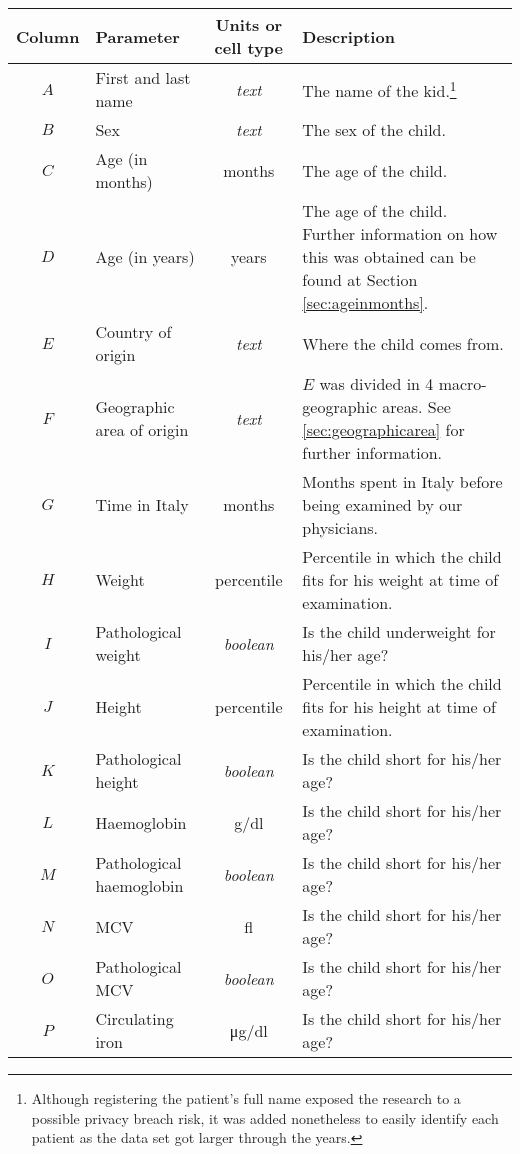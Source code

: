 \begin{footnotesize}
	\centering
	\begin{longtable}{C{.09\mylength} p{.25\mylength} C{.20\mylength} p{.40\mylength}}
	Column & Parameter & Units or cell type & Description\\
	\hline
	$A$ & First and last name & \textit{text} & The name of the kid.\footnote{Although registering the patient's full name exposed the research to a possible privacy breach risk, it was added nonetheless to easily identify each patient as the data set got larger through the years.}\\
	$B$ & Sex & \textit{text} & The sex of the child.\\
	$C$ & Age (in months) & months & The age of the child.\\
	$D$ & Age (in years) & years & The age of the child. Further information on how this was obtained can be found at Section \ref{sec:ageinmonths}.\\
	$E$ & Country of origin & \textit{text} & Where the child comes from.\\
	$F$ & Geographic area of origin & \textit{text} & $E$ was divided in 4 macro-geographic areas. See \ref{sec:geographicarea} for further information.\\
	$G$ & Time in Italy & months &  Months spent in Italy before being examined by our physicians.\\
	$H$ & Weight & percentile & Percentile in which the child fits for his weight at time of examination.\\
	$I$ & Pathological weight & \textit{boolean} & Is the child underweight for his/her age?\\
	$J$ & Height & percentile & Percentile in which the child fits for his height at time of examination.\\
	$K$ & Pathological height & \textit{boolean} & Is the child short for his/her age?\\
	$L$ & Haemoglobin & \si{\gram}/\si{\deci\litre} & Is the child short for his/her age?\\
	$M$ & Pathological haemoglobin & \textit{boolean} & Is the child short for his/her age?\\
	$N$ & MCV & \si{\femto\litre} & Is the child short for his/her age?\\
	$O$ & Pathological MCV & \textit{boolean} & Is the child short for his/her age?\\
	$P$ & Circulating iron & \si{\micro\gram}/\si{\deci\litre} & Is the child short for his/her age?\\

\end{longtable}
\end{footnotesize}

